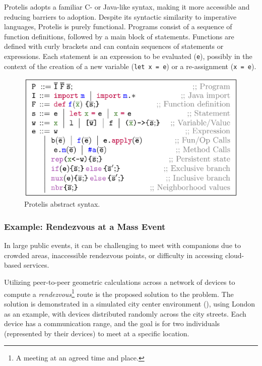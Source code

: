 Protelis adopts a familiar C- or Java-like syntax, making it more accessible and reducing barriers to adoption. Despite its syntactic similarity to imperative languages, Protelis is purely functional. Programs consist of a sequence of function definitions, followed by a main block of statements. Functions are defined with curly brackets and can contain sequences of statements or expressions. Each statement is an expression to be evaluated (\texttt{e}), possibly in the context of the creation of a new variable (\texttt{let x = e}) or a re-assignment (\texttt{x = e}).

\begin{figure}
    \centering
    \includegraphics[width=.8\linewidth]{figures/protelis-syntax.png}
    \caption{Protelis abstract syntax.}
    \label{fig:protelis-syntax}
\end{figure}

\subsubsection{Example: Rendezvous at a Mass Event}

In large public events, it can be challenging to meet with companions due to crowded areas, inaccessible rendezvous points, or difficulty in accessing cloud-based services.

Utilizing peer-to-peer geometric calculations across a network of devices to compute a \textit{rendezvous}\footnote{A meeting at an agreed time and place.} route is the proposed solution to the problem. The solution is demonstrated in a simulated city center environment (), using London as an example, with devices distributed randomly across the city streets. Each device has a communication range, and the goal is for two individuals (represented by their devices) to meet at a specific location.

